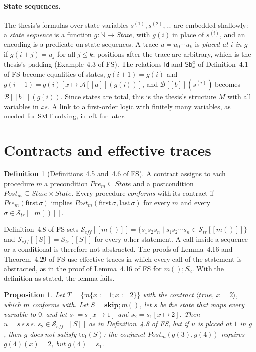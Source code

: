\documentclass[11pt]{article}
\newcommand{\sem}[1]{[\![ #1 ]\!]}
\newcommand{\Str}{{\mathcal{S}_{\mathit{tr}}}}
\newcommand{\Seff}{{\mathcal{S}_{\mathit{eff}}}}
\newcommand{\Id}{\mathsf{Id}}
\newcommand{\Sb}[2]{\mathsf{Sb}^{#1}_{#2}}
\newcommand{\State}{\mathit{State}}
\newcommand{\kw}[1]{\mathbf{#1}}
\newcommand{\skipS}{\kw{skip}}
\newcommand{\call}[1]{#1()}
\newcommand{\Pre}{\mathit{Pre}}
\newcommand{\Post}{\mathit{Post}}
\newcommand{\tc}{\mathrm{tc}}
\newcommand{\first}{\mathrm{first}}
\newcommand{\last}{\mathrm{last}}
\newcommand{\B}{\mathcal{B}}
\newcommand{\A}{\mathcal{A}}
\newcommand{\Th}[1]{#1 of FS}
\theoremstyle{plain}
\newtheorem{proposition}[theorem]{Proposition}
\theoremstyle{definition}
\newtheorem{definition}[theorem]{Definition}
\theoremstyle{remark}
\begin{document}
\paragraph{State sequences.} The thesis's formulas over state variables
$s^{(1)}, s^{(2)}, \dots$ are embedded shallowly: a \emph{state sequence} is
a function $g : \mathbb{N} \to \State$, with $g(i)$ in place of $s^{(i)}$,
and an encoding is a predicate on state sequences. A trace
$u = u_0 \cdots u_{k}$ is \emph{placed at $i$ in $g$} if $g(i+j) = u_j$ for
all $j \leq k$; positions after the trace are arbitrary, which is the
thesis's padding (\Th{Example~4.3}). The relations $\Id$ and $\Sb{a}{x}$ of
\Th{Definition~4.1} become equalities of states,
$g(i+1) = g(i)$ and $g(i+1) = g(i)[x \mapsto \A\sem{a}(g(i))]$, and
$\B\sem{b}(s^{(i)})$ becomes $\B\sem{b}(g(i))$. Since states are total,
this is the thesis's structure $M$ with all variables in $xs$. A link to a
first-order logic with finitely many variables, as needed for SMT solving,
is left for later.

\section{Contracts and effective traces}

\begin{definition}[\Th{Definitions~4.5 and~4.6}]
  A contract assigns to each procedure $m$ a precondition
  $\Pre_m \subseteq \State$ and a postcondition
  $\Post_m \subseteq \State \times \State$. Every procedure
  \emph{conforms} with its contract if $\Pre_m(\first\,\sigma)$ implies
  $\Post_m(\first\,\sigma, \last\,\sigma)$ for every $m$ and every
  $\sigma \in \Str\sem{\call{m}}$.
\end{definition}

\Th{Definition~4.8} sets
$\Seff\sem{\call{m}} = \{s_1 s_2 s_n \mid s_1 s_2 \cdots s_n \in
\Str\sem{\call{m}}\}$ and $\Seff\sem{S} = \Str\sem{S}$ for every other
statement. A call inside a sequence or a conditional is therefore not
abstracted. The proofs of \Th{Lemma~4.16 and Theorem~4.29} use effective
traces in which every call of the statement is abstracted, as in the
proof of \Th{Lemma~4.16} for $\call{m}; S_2$. With the definition as
stated, the lemma fails.

\begin{proposition}\label{prop:seff}
  Let $T = \{m\{x := 1; x := 2\}\}$ with the contract
  $\langle \mathit{true},\ x = 2\rangle$, which $m$ conforms with. Let
  $S = \skipS; \call{m}$, let $s$ be the state that maps every variable
  to $0$, and let $s_1 = s[x \mapsto 1]$ and $s_2 = s_1[x \mapsto 2]$. Then
  $u = s\,s\,s\,s_1\,s_2 \in \Seff\sem{S}$ as in \Th{Definition~4.8},
  but if $u$ is placed at $1$ in $g$, then $g$ does not satisfy $\tc_1(S)$:
  the conjunct $\Post_m(g(3), g(4))$ requires $g(4)(x) = 2$, but
  $g(4) = s_1$.
\end{proposition}
\end{document}
